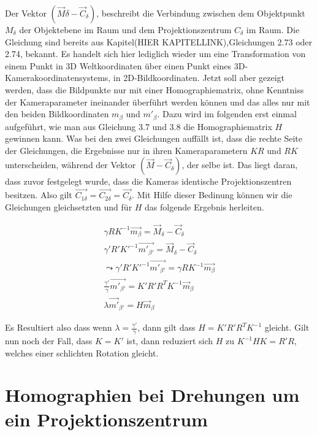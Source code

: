 Der Vektor $(\vec{M}\delta - \vec{C}_\delta)$, beschreibt die Verbindung zwischen dem Objektpunkt $M_\delta$ der Objektebene im Raum und dem Projektionszentrum $C_\delta$ im Raum. Die Gleichung sind bereits aus Kapitel(HIER KAPITELLINK),Gleichungen 2.73 oder 2.74, bekannt. Es handelt sich hier lediglich wieder um eine Transformation von einem Punkt in 3D Weltkoordinaten über einen Punkt eines 3D- Kamerakoordinatensystems, in 2D-Bildkoordinaten. Jetzt soll aber gezeigt werden, dass die Bildpunkte nur mit einer Homographiematrix, ohne Kenntniss der Kameraparameter ineinander überführt werden können und das alles nur mit den beiden Bildkoordinaten $m_\beta$ und $m'_{\beta}$. Dazu wird im folgenden erst einmal aufgeführt, wie man aus Gleichung 3.7 und 3.8 die Homographiematrix $H$ gewinnen kann. Was bei den zwei Gleichungen auffällt ist, dass die rechte Seite der Gleichungen, die Ergebnisse nur in ihren Kameraparametern $KR$ und $RK$ unterscheiden, während der Vektor $(\vec{M}-\vec{C}_\delta)$, der selbe ist. Das liegt daran, dass zuvor festgelegt wurde, dass die Kameras identische Projektionszentren besitzen. Also gilt $\vec{C_{1\delta}} = \vec{C_{2\delta}} = \vec{C_{\delta}}$. Mit Hilfe dieser Bedinung können wir die Gleichungen gleichsetzten und für $H$ das folgende Ergebnis herleiten. 


\begin{gather}
	\gamma RK^{-1}\vec{m_\beta} = \vec{M}_\delta - \vec{C}_\delta\\
	\gamma' R'K'^{-1}\vec{m'_{\beta'}} = \vec{M}_\delta - \vec{C}_\delta\\
	\leadsto \gamma' R'K'^{-1}\vec{m'_{\beta'}}=\gamma RK^{-1}\vec{m_\beta}\\
	\frac{\gamma'}{\gamma}\vec{m'_{\beta'}} = K'R'R^TK^{-1}\vec{m}_\beta\\
	\lambda \vec{m'}_{\beta'} = H\vec{m}_\beta
\end{gather}

Es Resultiert also dass wenn $\lambda = \frac{\gamma'}{\gamma}$, dann gilt dass $H = K'R'R^TK^{-1}$ gleicht. Gilt nun noch der Fall, dass $K = K'$ ist, dann reduziert sich $H$ zu $K^{-1}HK = R'R$, welches einer schlichten Rotation gleicht.\cite{Elements}




\section{Homographien bei Drehungen um ein Projektionszentrum}

